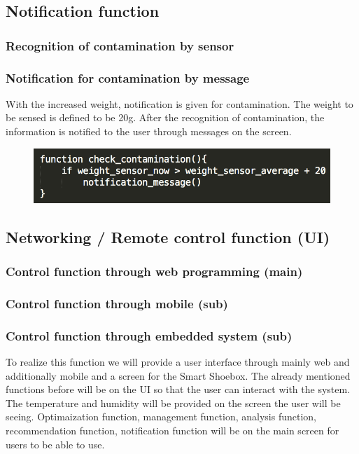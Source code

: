 \documentclass[conference]{IEEEtran}
\begin{document}
\subsection{Notification function}
\subsubsection{Recognition of contamination by sensor}
\subsubsection{Notification for contamination by message}
With the increased weight, notification is given for contamination. The weight to be sensed is defined to be 20g.
After the recognition of contamination, the information is notified to the user through messages on the screen.
\begin{figure}[h]
\begin{center}
    \includegraphics[scale=0.6]{notification1}
    \label{fig:label}
\end{center}
\end{figure}

\subsection{Networking / Remote control function (UI)}
\subsubsection{Control function through web programming (main)}
\subsubsection{Control function through mobile (sub)}
\subsubsection{Control function through embedded system (sub)}
To realize this function we will provide a user interface through mainly web and additionally mobile and a screen for the Smart Shoebox. The already mentioned functions before will be on the UI so that the user can interact with the system. The temperature and humidity will be provided on the screen the user will be seeing. Optimaization function, management function, analysis function, recommendation function, notification function will be on the main screen for users to be able to use. 
\end{document}
